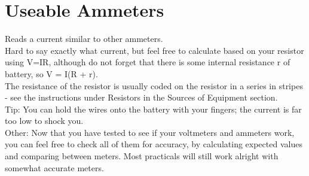 \section{Useable Ammeters}
Reads a current similar to other ammeters. \\
Hard to say exactly what current, 
but feel free to calculate based on your resistor using V=IR, although do not
forget that there is some internal resistance r of battery, so V = I(R + r). \\
The resistance of the resistor is usually coded on the resistor in a series in stripes -
see the instructions under Resistors in the Sources of Equipment section.  \\
Tip: You can hold the wires onto the battery with your fingers; the current
is far too low to shock you.  \\
Other: Now that you have tested to see if your voltmeters and ammeters
work, you can feel free to check all of them for accuracy, by calculating expected
values and comparing between meters. Most practicals will still work alright
with somewhat accurate meters.